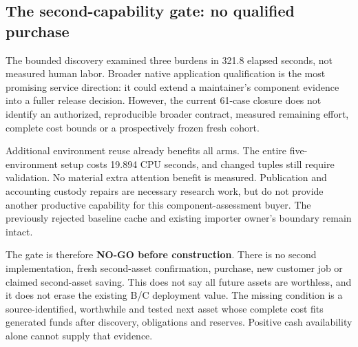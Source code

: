 

\subsection{The second-capability gate: no qualified purchase}
The bounded discovery examined three burdens in 321.8 elapsed seconds, not measured human labor.
Broader native application qualification is the most promising service direction: it could
extend a maintainer's component evidence into a fuller release decision. However, the current
61-case closure does not identify an authorized, reproducible broader contract, measured
remaining effort, complete cost bounds or a prospectively frozen fresh cohort.

Additional environment reuse already benefits all arms. The entire five-environment setup costs
19.894 CPU seconds, and changed tuples still require validation. No material extra attention
benefit is measured. Publication and accounting custody repairs are necessary research work,
but do not provide another productive capability for this component-assessment buyer.
The previously rejected baseline cache and existing importer owner's boundary remain intact.

The gate is therefore \textbf{NO-GO before construction}. There is no second implementation,
fresh second-asset confirmation, purchase, new customer job or claimed second-asset saving.
This does not say all future assets are worthless, and it does not erase the existing B/C
deployment value. The missing condition is a source-identified, worthwhile and tested next
asset whose complete cost fits generated funds after discovery, obligations and reserves.
Positive cash availability alone cannot supply that evidence.

